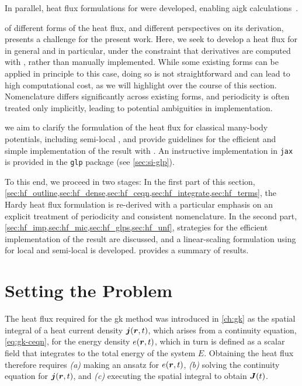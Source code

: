 In parallel, heat flux formulations for \dft were developed, enabling \gls{aigk} calculations~\cite{mub2016t,crs2017t}.

 of different forms of the heat flux, and different perspectives on its derivation, presents a challenge for the present work. 
Here, we seek to develop a heat flux for \mlps in general and \glps in particular, under the constraint that derivatives are computed with \ad, rather than manually implemented.
While some existing forms can be applied in principle to this case, doing so is not straightforward and can lead to high computational cost, as we will highlight over the course of this section. Nomenclature differs significantly across existing forms, and periodicity is often treated only implicitly, leading to potential ambiguities in implementation.

 we aim to clarify the formulation of the heat flux for classical many-body potentials, including semi-local \glps, and provide guidelines for the efficient and simple implementation of the result with \ad. An instructive implementation in \texttt{jax}~\cite{jax} is provided in the \texttt{glp} package (see \cref{sec:si-glp}).

To this end, we proceed in two stages:
In the first part of this section, \cref{sec:hf_outline,sec:hf_dense,sec:hf_ceqn,sec:hf_integrate,sec:hf_terms}, the Hardy heat flux formulation is re-derived with a particular emphasis on an explicit treatment of periodicity and consistent nomenclature.
In the second part, \cref{sec:hf_imp,sec:hf_mic,sec:hf_glps,sec:hf_unf}, strategies for the efficient implementation of the result are discussed, and a linear-scaling formulation using \ad for local and semi-local \glps is developed.
 provides a summary of results.

\section{Setting the Problem}
\label{sec:hf_outline}

The heat flux required for the \gls{gk} method was introduced in \cref{ch:gk} as the spatial integral of a heat current density $\boldsymbol{j}(\boldsymbol{r}, t)$, which arises from a continuity equation, \cref{eq:gk-ceqn}, for the energy density $e(\boldsymbol{r}, t)$, which in turn is defined as a scalar field that integrates to the total energy of the system $E$.
Obtaining the heat flux therefore requires \emph{(a)} making an ansatz for $e(\boldsymbol{r}, t)$, \emph{(b)} solving the continuity equation for $\boldsymbol{j}(\boldsymbol{r},t)$, and \emph{(c)} executing the spatial integral to obtain $\boldsymbol{J}(t)$.


